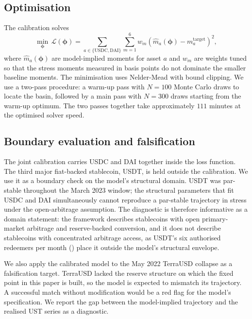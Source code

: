 \subsection{Optimisation}\label{sub:optimisation}

The calibration solves
\begin{equation}\label{eq:loss}
\min_{\boldsymbol{\phi}} \, \mathcal{L}(\boldsymbol{\phi}) = \sum_{a \in \{\text{USDC}, \text{DAI}\}} \sum_{m=1}^{6} w_m \left(\hat{m}_a(\boldsymbol{\phi}) - m_a^{\text{target}}\right)^2,
\end{equation}
where $\hat{m}_a(\boldsymbol{\phi})$ are model-implied moments for asset $a$ and $w_m$ are weights tuned so that the stress moments measured in basis points do not dominate the smaller baseline moments. The minimisation uses Nelder-Mead with bound clipping. We use a two-pass procedure: a warm-up pass with $N=100$ Monte Carlo draws to locate the basin, followed by a main pass with $N=300$ draws starting from the warm-up optimum. The two passes together take approximately $111$ minutes at the optimised solver speed.

\subsection{Boundary evaluation and falsification}\label{sub:oos_falsification}

The joint calibration carries USDC and DAI together inside the loss function. The third major fiat-backed stablecoin, USDT, is held outside the calibration. We use it as a boundary check on the model's structural domain. USDT was par-stable throughout the March 2023 window; the structural parameters that fit USDC and DAI simultaneously cannot reproduce a par-stable trajectory in stress under the open-arbitrage assumption. The diagnostic is therefore informative as a domain statement: the framework describes stablecoins with open primary-market arbitrage and reserve-backed conversion, and it does not describe stablecoins with concentrated arbitrage access, as USDT's six authorised redeemers per month (\citealp{ma_zeng_zhang_2025}) place it outside the model's structural envelope.

We also apply the calibrated model to the May 2022 TerraUSD collapse as a falsification target. TerraUSD lacked the reserve structure on which the fixed point in this paper is built, so the model is expected to mismatch its trajectory. A successful match without modification would be a red flag for the model's specification. We report the gap between the model-implied trajectory and the realised UST series as a diagnostic.
